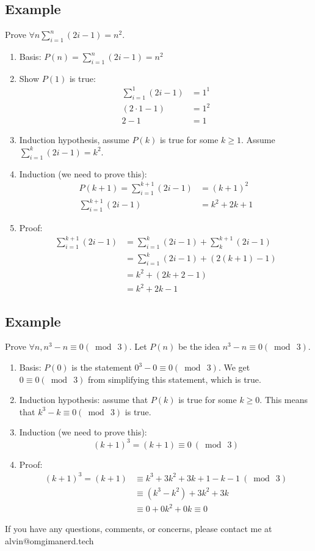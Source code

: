 \documentclass[letterpaper, 12pt]{math}
\begin{document}
\subsection*{Example}
Prove \( \forall{n}\sum_{i=1}^{n}(2i-1) = n^{2} \).
\begin{enumerate}
  \item Basis: \( P(n) = \sum_{i=1}^{n}(2i-1) = n^{2} \)
  \item Show \( P(1) \) is true:
    \begin{align*}
      \sum_{i=1}^{1}(2i-1) &= 1^{1} \\
      (2\cdot1-1) &= 1^{2} \\
      2-1 &= 1
    \end{align*}
  \item Induction hypothesis, assume \( P(k) \) is true for some \( k\geq 1 \).
    Assume \( \sum_{i=1}^{k}(2i-1) = k^{2} \).
  \item Induction (we need to prove this):
    \begin{align*}
      P(k+1) = \sum_{i=1}^{k+1}(2i-1) &= (k+1)^{2} \\
      \sum_{i=1}^{k+1}(2i-1) &= k^{2}+2k+1
    \end{align*}
  \item Proof:
    \begin{align*}
      \sum_{i=1}^{k+1}(2i-1) &= \sum_{i=1}^{k}(2i-1)+\sum_{k}^{k+1}(2i-1) \\
      &= \sum_{i=1}^{k}(2i-1)+(2(k+1)-1) \\
      &= k^{2}+(2k+2-1) \\
      &= k^{2}+2k-1
    \end{align*}
\end{enumerate}

\subsection*{Example}
Prove \( \forall{n}, n^{3}-n \equiv 0 (\bmod\ 3) \). Let \( P(n) \) be the idea
\( n^{3}-n \equiv 0 (\bmod\ 3) \).
\begin{enumerate}
  \item Basis: \( P(0) \) is the statement \( 0^{3}-0 \equiv 0 (\bmod\ 3) \).
    We get \( 0 \equiv 0(\bmod\ 3) \) from simplifying this statement, which is
    true.
  \item Induction hypothesis: assume that \( P(k) \) is true for some
    \( k\geq0 \). This means that \( k^{3}-k \equiv 0(\bmod\ 3) \) is true.
  \item Induction (we need to prove this):
    \[ (k+1)^{3}=(k+1) \equiv 0\ (\bmod\ 3) \]
  \item Proof:
    \begin{align*}
      (k+1)^{3}=(k+1) &\equiv k^{3}+3k^{2}+3k+1-k-1\ (\bmod\ 3) \\
      &\equiv (k^{3}-k^{2})+3k^{2}+3k \\
      &\equiv 0+0k^{2}+0k \equiv 0
    \end{align*}
\end{enumerate}

\begin{center}
  If you have any questions, comments, or concerns, please contact me at
  alvin@omgimanerd.tech
\end{center}
\end{document}
